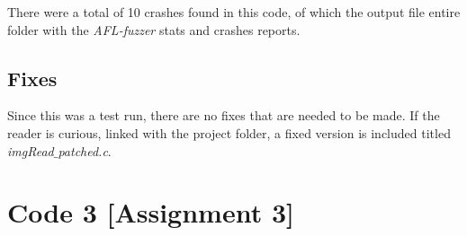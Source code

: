 \documentclass[11pt]{article}
\begin{document}
There were a total of 10 crashes found in this code, of which the output file entire folder with the \textit{AFL-fuzzer} stats and crashes reports. 

\subsection{Fixes}
Since this was a test run, there are no fixes that are needed to be made. If the reader is curious, linked with the project folder, a fixed version is included titled \textit{imgRead$\_$patched.c}.  


\newpage

\section{Code 3 [Assignment 3]}
\end{document}
